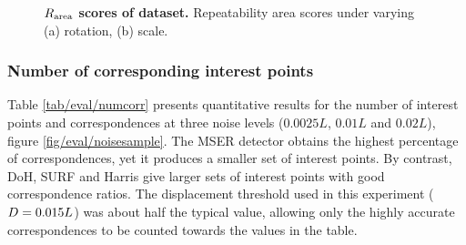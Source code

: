 \begin{figure}[ht]
\begin{subfigure}[t]{0.48\linewidth}
		\label{fig/eval/graph_scaling}
	\end{subfigure}
	\caption{\textbf{$R_\textrm{area}$ scores of \meshset dataset.} Repeatability area scores under varying (a) rotation, (b) scale.}
	\label{fig/eval/graph_graph1} 
\end{figure}

\subsubsection{Number of corresponding interest points}

Table \ref{tab/eval/numcorr} presents quantitative results for the number of interest points and correspondences at three noise levels ($0.0025L$, $0.01L$ and $0.02L$), \cf figure \ref{fig/eval/noisesample}.
The MSER detector obtains the highest percentage of correspondences, yet it produces a smaller set of interest points. By contrast, DoH, SURF and Harris give larger sets of interest points with good correspondence ratios. The displacement threshold used in this experiment ($D = 0.015L$) was about half the typical value, allowing only the highly accurate correspondences to be counted towards the values in the table. 

